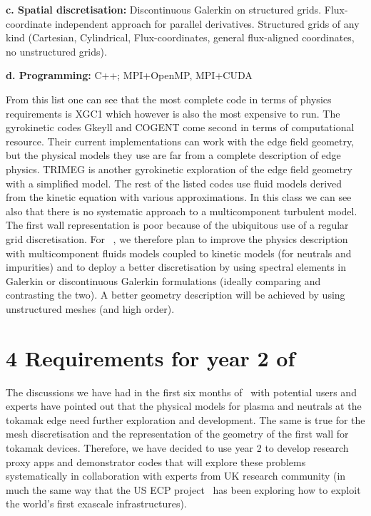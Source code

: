 \documentclass{article}
\begin{document}
\textbf{c. Spatial discretisation:  }Discontinuous Galerkin on structured grids. 
Flux-coordinate independent approach for parallel derivatives. Structured grids 
of any kind (Cartesian, Cylindrical, Flux-coordinates, general flux-aligned coordinates, 
no unstructured grids).

\textbf{d. Programming: }C++; MPI+OpenMP, MPI+CUDA

From this list one can see that the most complete code in terms of physics requirements 
is XGC1 which however is also the most expensive to run. The gyrokinetic codes 
Gkeyll and COGENT come second in terms of computational resource. Their current 
implementations can work with the edge field geometry, but the physical models 
they use are far from a complete description of edge physics. TRIMEG is another 
gyrokinetic exploration of the edge field geometry with a simplified model. The 
rest of the listed codes use fluid models derived from the kinetic equation with 
various approximations. In this class we can see also that there is no systematic 
approach to a multicomponent turbulent model. The first wall representation is 
poor because of the ubiquitous use of a regular grid discretisation. For { \nep \  , 
we therefore plan to improve the physics description with multicomponent fluids 
models coupled to kinetic models (for neutrals and impurities) and to deploy a 
better discretisation by using spectral elements in Galerkin or discontinuous Galerkin 
formulations (ideally comparing and contrasting the two). A better geometry description 
will be achieved by using unstructured meshes (and high order).}

\section*{{\Large{}{ \textbf{4 Requirements for year 2 of \nep \  }}}}

The discussions we have had in the first six months of \nep \   with potential users 
and experts have pointed out that the physical models for plasma and neutrals at 
the tokamak edge need further exploration and development. The same is true for 
the mesh discretisation and the representation of the geometry of the first wall 
for tokamak devices. Therefore, we have decided to use year 2 to develop research 
proxy apps and demonstrator codes that will explore these problems systematically 
in collaboration with experts from UK research community (in much the same way 
that the US ECP project~\cite{ref [22]} has been exploring how to exploit the world's first 
exascale infrastructures).
\end{document}

